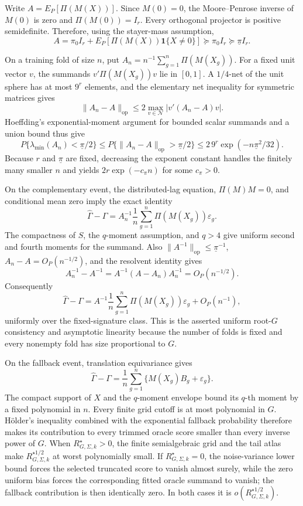 Write \(A=E_P[\Pi(M(X))]\). Since \(M(0)=0\), the Moore--Penrose inverse of \(M(0)\) is zero and \(\Pi(M(0))=I_r\). Every orthogonal projector is positive semidefinite. Therefore, using the stayer-mass assumption,
\[
A=\pi_0 I_r+E_P[\Pi(M(X))\mathbf 1\{X\ne0\}]
\succeq \pi_0I_r\succeq\underline\pi I_r.
\]

On a training fold of size \(n\), put \(A_n=n^{-1}\sum_{g=1}^n\Pi(M(X_g))\). For a fixed unit vector \(v\), the summands \(v'\Pi(M(X_g))v\) lie in \([0,1]\). A \(1/4\)-net of the unit sphere has at most \(9^r\) elements, and the elementary net inequality for symmetric matrices gives
\[
\|A_n-A\|_{\mathrm{op}}
\le 2\max_{v\in\mathcal N}|v'(A_n-A)v|.
\]
Hoeffding's exponential-moment argument for bounded scalar summands and a union bound thus give
\[
P\{\lambda_{\min}(A_n)<\underline\pi/2\}
\le P\{\|A_n-A\|_{\mathrm{op}}>\underline\pi/2\}
\le 2\,9^r\exp(-n\underline\pi^2/32).
\]
Because \(r\) and \(\underline\pi\) are fixed, decreasing the exponent constant handles the finitely many smaller \(n\) and yields \(2r\exp(-c_\pi n)\) for some \(c_\pi>0\).

On the complementary event, the distributed-lag equation, \(\Pi(M)M=0\), and conditional mean zero imply the exact identity
\[
\widehat\Gamma-\Gamma
=A_n^{-1}\frac1n\sum_{g=1}^n\Pi(M(X_g))\varepsilon_g.
\]
The compactness of \(S\), the \(q\)-moment assumption, and \(q>4\) give uniform second and fourth moments for the summand. Also \(\|A^{-1}\|_{\mathrm{op}}\le\underline\pi^{-1}\), \(A_n-A=O_P(n^{-1/2})\), and the resolvent identity gives
\[
A_n^{-1}-A^{-1}=A^{-1}(A-A_n)A_n^{-1}=O_P(n^{-1/2}).
\]
Consequently
\[
\widehat\Gamma-\Gamma
=A^{-1}\frac1n\sum_{g=1}^n\Pi(M(X_g))\varepsilon_g+O_P(n^{-1}),
\]
uniformly over the fixed-signature class. This is the asserted uniform root-\(G\) consistency and asymptotic linearity because the number of folds is fixed and every nonempty fold has size proportional to \(G\).

On the fallback event, translation equivariance gives
\[
\widehat\Gamma-\Gamma
=\frac1n\sum_{g=1}^n\{M(X_g)B_g+\varepsilon_g\}.
\]
The compact support of \(X\) and the \(q\)-moment envelope bound its \(q\)-th moment by a fixed polynomial in \(n\). Every finite grid cutoff is at most polynomial in \(G\). Hölder's inequality combined with the exponential fallback probability therefore makes its contribution to every trimmed oracle score smaller than every inverse power of \(G\). When \(R_{G,\Sigma,k}^{\star}>0\), the finite semialgebraic grid and the tail atlas make \(R_{G,\Sigma,k}^{\star 1/2}\) at worst polynomially small. If \(R_{G,\Sigma,k}^{\star}=0\), the noise-variance lower bound forces the selected truncated score to vanish almost surely, while the zero uniform bias forces the corresponding fitted oracle summand to vanish; the fallback contribution is then identically zero. In both cases it is \(o(R_{G,\Sigma,k}^{\star 1/2})\).